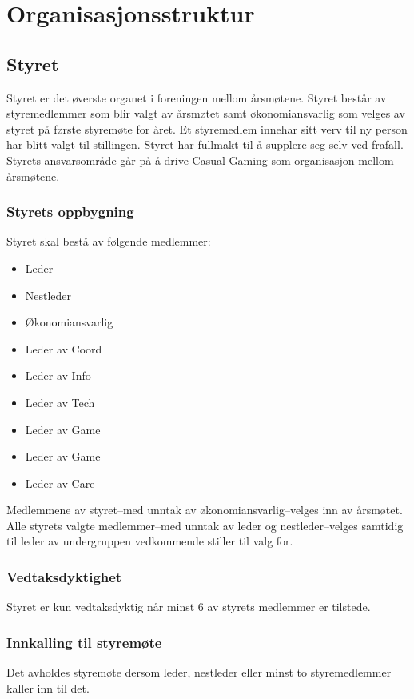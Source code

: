 \chapter{Organisasjonsstruktur}

\section{Styret}
Styret er det øverste organet i foreningen mellom årsmøtene. Styret består av styremedlemmer som blir valgt av årsmøtet samt økonomiansvarlig som velges av styret på første styremøte for året. Et styremedlem innehar sitt verv til ny person har blitt valgt til stillingen. Styret har fullmakt til å supplere seg selv ved frafall. Styrets ansvarsområde går på å drive Casual Gaming som organisasjon mellom årsmøtene.

\subsection{Styrets oppbygning}
Styret skal bestå av følgende medlemmer:
\begin{itemize}
    \item Leder
    \item Nestleder
    \item Økonomiansvarlig
    \item Leder av Coord
    \item Leder av Info
    \item Leder av Tech
    \item Leder av Game
    \item Leder av Game
    \item Leder av Care
\end{itemize}

Medlemmene av styret–med unntak av økonomiansvarlig–velges inn av årsmøtet. Alle styrets valgte medlemmer–med unntak av leder og nestleder–velges samtidig til leder av undergruppen vedkommende stiller til valg for.

\subsection{Vedtaksdyktighet}
Styret er kun vedtaksdyktig når minst 6 av styrets medlemmer er tilstede.

\subsection{Innkalling til styremøte}
Det avholdes styremøte dersom leder, nestleder eller minst to styremedlemmer kaller inn til det.

